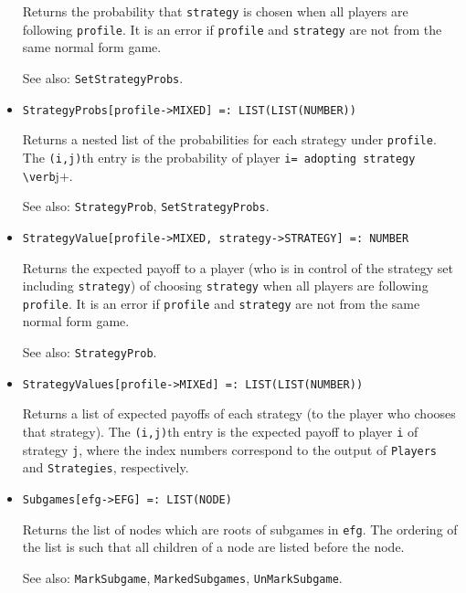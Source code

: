 \begin{itemize}
\bd
Returns the probability that \verb+strategy+ is chosen when all
players are following \verb+profile+.  It is an error if \verb+profile+
and \verb+strategy+ are not from the same normal form game.
\item [See also:] \verb+SetStrategyProbs+.
\ed

\item{}
\protect \large \begin{verbatim}
StrategyProbs[profile->MIXED] =: LIST(LIST(NUMBER)) 
\end{verbatim} \normalsize

\bd
Returns a nested list of the probabilities for each strategy under
\verb+profile+.  The \verb+(i,j)+th entry is the probability of player
\verb+i= adopting strategy \verb+j+.
\item [See also:] \verb+StrategyProb+, \verb+SetStrategyProbs+.
\ed

\item{}
\protect \large \begin{verbatim}
StrategyValue[profile->MIXED, strategy->STRATEGY] =: NUMBER 
\end{verbatim}\normalsize

\bd 
Returns the expected payoff to a player (who is in control of the
strategy set including \verb+strategy+) of choosing \verb+strategy+ when
all players are following \verb+profile+.  It is an error if
\verb+profile+ and \verb+strategy+ are not from the same normal form
game.
\item [See also:] \verb+StrategyProb+. 
\ed

\item{}
\protect \large \begin{verbatim}
StrategyValues[profile->MIXEd] =: LIST(LIST(NUMBER)) 
\end{verbatim}\normalsize

\bd
Returns a list of expected payoffs of each strategy (to the player
who chooses that strategy).  The \verb+(i,j)+th entry is
the expected payoff to player \verb+i+ of
strategy \verb+j+, where the index numbers correspond to the output of
\verb+Players+ and \verb+Strategies+, respectively.
\ed

\item{}
\protect \large \begin{verbatim}
Subgames[efg->EFG] =: LIST(NODE) 
\end{verbatim}\normalsize

\bd
Returns the list of nodes which are roots of subgames in \verb+efg+.
The ordering of the list is such that
all children of a node are listed before the node.
\item [See also:] \verb+MarkSubgame+, \verb+MarkedSubgames+, 
\verb+UnMarkSubgame+.
\ed


\end{itemize}
